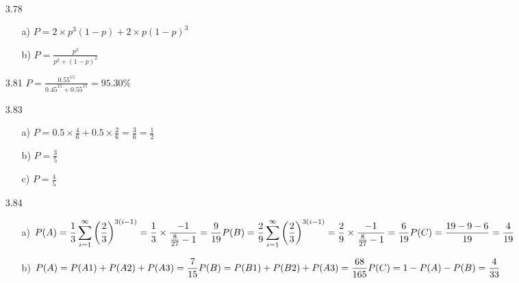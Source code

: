 \documentclass{article}
\begin{document}
\begin{itemize}
\begin{itemize}
\begin{align*}
\end{align*}
    \end{itemize}
    \item [3.78]
    \begin{itemize}
        \item [a)] \(P = 2\times p^3(1-p)+2\times p(1-p)^3\)
        \item [b)] \(P = \frac{p^2}{p^2+(1-p)^2}\)
    \end{itemize}
    \item [3.81]\(\displaystyle
    P = \frac{0.55^{15}}{0.45^{15}+0.55^{15}} = 95.30\%
    \)
    \item [3.83]\begin{itemize}
        \item [a)]\(P = 0.5\times \frac{4}{6}+0.5\times\frac{2}{6}=\frac{3}{6}=\frac{1}{2}\)
        \item [b)]\(P = \frac{3}{5}\)
        \item [c)]\(P = \frac{4}{5}\)
    \end{itemize}
    \item [3.84]
    \begin{itemize}
        \item [a)]\(\displaystyle P(A) = \frac{1}{3}\sum_{i=1}^{\infty} \left(\frac{2}{3}\right)^{3(i-1)} = \frac{1}{3}\times\frac{-1}{\frac{8}{27}-1}=\frac{9}{19} \\
        P(B) = \frac{2}{9}\sum_{i=1}^{\infty} \left(\frac{2}{3}\right)^{3(i-1)} = \frac{2}{9}\times\frac{-1}{\frac{8}{27}-1}=\frac{6}{19}\\
        P(C) = \frac{19-9-6}{19} = \frac{4}{19} 
        \)
        
        \item [b)]\(\displaystyle
        P(A) =  P(A1)+P(A2)+P(A3) = \frac{7}{15}\\
        P(B) =  P(B1)+P(B2)+P(A3) = \frac{68}{165}\\
        P(C) =  1-P(A)-P(B)= \frac{4}{33}
        \)
    \end{itemize}
\end{itemize}
\end{document}
